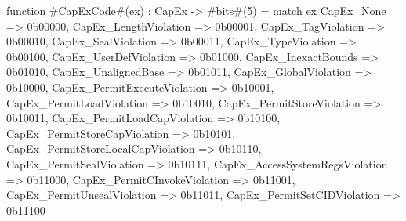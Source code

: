 function #\hyperref[sailRISCVzCapExCode]{CapExCode}#(ex) : CapEx -> #\hyperref[sailRISCVzbits]{bits}#(5) =
  match ex {
    CapEx_None                          => 0b00000,
    CapEx_LengthViolation               => 0b00001,
    CapEx_TagViolation                  => 0b00010,
    CapEx_SealViolation                 => 0b00011,
    CapEx_TypeViolation                 => 0b00100,
    CapEx_UserDefViolation              => 0b01000,
    CapEx_InexactBounds                 => 0b01010,
    CapEx_UnalignedBase                 => 0b01011,
    CapEx_GlobalViolation               => 0b10000,
    CapEx_PermitExecuteViolation        => 0b10001,
    CapEx_PermitLoadViolation           => 0b10010,
    CapEx_PermitStoreViolation          => 0b10011,
    CapEx_PermitLoadCapViolation        => 0b10100,
    CapEx_PermitStoreCapViolation       => 0b10101,
    CapEx_PermitStoreLocalCapViolation  => 0b10110,
    CapEx_PermitSealViolation           => 0b10111,
    CapEx_AccessSystemRegsViolation     => 0b11000,
    CapEx_PermitCInvokeViolation        => 0b11001,
    CapEx_PermitUnsealViolation         => 0b11011,
    CapEx_PermitSetCIDViolation         => 0b11100
  }
